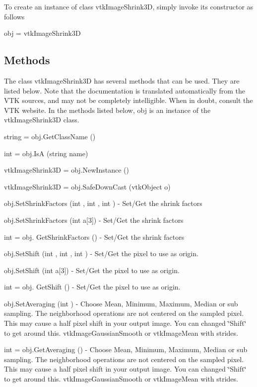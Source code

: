 To create an instance of class vtk\-Image\-Shrink3\-D, simply invoke its constructor as follows \begin{DoxyVerb}  obj = vtkImageShrink3D
\end{DoxyVerb}
 \hypertarget{vtkwidgets_vtkxyplotwidget_Methods}{}\subsection{Methods}\label{vtkwidgets_vtkxyplotwidget_Methods}
The class vtk\-Image\-Shrink3\-D has several methods that can be used. They are listed below. Note that the documentation is translated automatically from the V\-T\-K sources, and may not be completely intelligible. When in doubt, consult the V\-T\-K website. In the methods listed below, {\ttfamily obj} is an instance of the vtk\-Image\-Shrink3\-D class. 
\begin{DoxyItemize}
\item {\ttfamily string = obj.\-Get\-Class\-Name ()}  
\item {\ttfamily int = obj.\-Is\-A (string name)}  
\item {\ttfamily vtk\-Image\-Shrink3\-D = obj.\-New\-Instance ()}  
\item {\ttfamily vtk\-Image\-Shrink3\-D = obj.\-Safe\-Down\-Cast (vtk\-Object o)}  
\item {\ttfamily obj.\-Set\-Shrink\-Factors (int , int , int )} -\/ Set/\-Get the shrink factors  
\item {\ttfamily obj.\-Set\-Shrink\-Factors (int a\mbox{[}3\mbox{]})} -\/ Set/\-Get the shrink factors  
\item {\ttfamily int = obj. Get\-Shrink\-Factors ()} -\/ Set/\-Get the shrink factors  
\item {\ttfamily obj.\-Set\-Shift (int , int , int )} -\/ Set/\-Get the pixel to use as origin.  
\item {\ttfamily obj.\-Set\-Shift (int a\mbox{[}3\mbox{]})} -\/ Set/\-Get the pixel to use as origin.  
\item {\ttfamily int = obj. Get\-Shift ()} -\/ Set/\-Get the pixel to use as origin.  
\item {\ttfamily obj.\-Set\-Averaging (int )} -\/ Choose Mean, Minimum, Maximum, Median or sub sampling. The neighborhood operations are not centered on the sampled pixel. This may cause a half pixel shift in your output image. You can changed \char`\"{}\-Shift\char`\"{} to get around this. vtk\-Image\-Gaussian\-Smooth or vtk\-Image\-Mean with strides.  
\item {\ttfamily int = obj.\-Get\-Averaging ()} -\/ Choose Mean, Minimum, Maximum, Median or sub sampling. The neighborhood operations are not centered on the sampled pixel. This may cause a half pixel shift in your output image. You can changed \char`\"{}\-Shift\char`\"{} to get around this. vtk\-Image\-Gaussian\-Smooth or vtk\-Image\-Mean with strides.  

\end{DoxyItemize}
